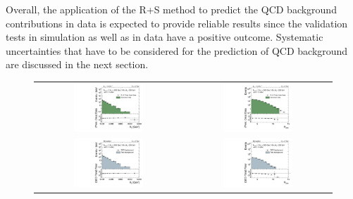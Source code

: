 Overall, the application of the R+S method to predict the QCD background contributions in data is expected to provide reliable results since the validation tests in simulation as well as in data have a positive outcome. Systematic uncertainties that have to be considered for the prediction of QCD background are discussed in the next section. 
\begin{figure}[!t]
  \centering
  \begin{tabular}{cc}
                \includegraphics[width=0.49\textwidth]{figures/HT_presel_HThigh_data_DR53X_chs_HThigh_invertedDeltaPhi_v1.pdf} &
                \includegraphics[width=0.49\textwidth]{figures/NJets_presel_HThigh_data_DR53X_chs_HThigh_invertedDeltaPhi_v1.pdf} \\
                \includegraphics[width=0.49\textwidth]{figures/HTRA2_MC.pdf} &
                \includegraphics[width=0.49\textwidth]{figures/NJetsRA2_MC.pdf}

\end{tabular}
\end{figure}
